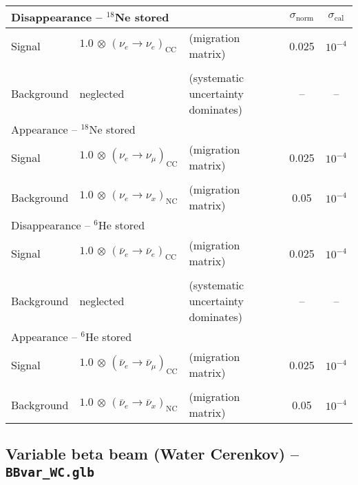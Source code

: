 \begin{center}
\begin{tabular}{|l|ll|c|c|}
\hline \hline
\multicolumn{3}{|l|}{Disappearance -- $^{18}$Ne stored} & $\sigma_\mathrm{norm}$ & $\sigma_\mathrm{cal}$ \\ \hline
Signal & $1.0 \, \otimes \, (\nu_e\rightarrow\nu_e)_{\mathrm{CC}}$ & (migration matrix) & 0.025 & $10^{-4}$ \\
 & & & & \\
Background & neglected & (systematic uncertainty dominates) & -- & -- \\ \hline \hline 
\multicolumn{3}{|l|}{Appearance -- $^{18}$Ne stored} & & \\ \hline
Signal & $1.0 \, \otimes \, (\nu_e \rightarrow \nu_\mu)_\mathrm{CC}$ & (migration matrix) & 0.025 & $10^{-4}$ \\
 & & & & \\
Background & $1.0 \, \otimes \, (\nu_e \rightarrow \nu_x)_\mathrm{NC}$ & (migration matrix) & 0.05 & $10^{-4}$
\\ \hline \hline
\multicolumn{3}{|l|}{Disappearance -- $^6$He stored} & &  \\ \hline
Signal & $1.0 \, \otimes \, (\bar{\nu}_e\rightarrow\bar{\nu}_e)_{\mathrm{CC}}$ & (migration matrix) & 0.025 & $10^{-4}$ \\
 & & & & \\
Background & neglected & (systematic uncertainty dominates) & -- & -- \\ \hline \hline 
\multicolumn{3}{|l|}{Appearance -- $^6$He stored} & & \\ \hline
Signal & $1.0 \, \otimes \, (\bar{\nu}_e \rightarrow \bar{\nu}_\mu)_\mathrm{CC}$ & (migration matrix)  &
0.025 & $10^{-4}$ \\
 & & & & \\
Background & $1.0 \, \otimes \, (\bar{\nu}_e \rightarrow \bar{\nu}_x)_\mathrm{NC}$ & (migration matrix) & 0.05 & $10^{-4}$ \\ \hline \hline
\end{tabular}
\end{center}

\subsection*{Variable beta beam (Water Cerenkov) -- {\tt BBvar\_WC.glb}}

